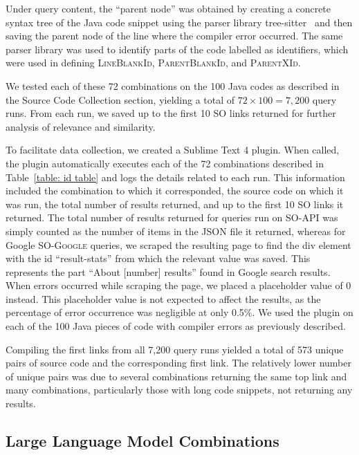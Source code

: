 \documentclass[preprint,12pt]{elsarticle}
\begin{document}
Under query content, the ``parent node'' was obtained by creating a concrete syntax tree of the Java code snippet using the parser library tree-sitter~\cite{tree-sitter} and then saving the parent node of the line where the compiler error occurred. The same parser library was used to identify parts of the code labelled as identifiers, which were used in defining \textsc{LineBlankId, ParentBlankId}, and \textsc{ParentXId}.

We tested each of these 72 combinations on the 100 Java codes as described in the Source Code Collection section, yielding a total of $72\times100=7,200$ query runs. From each run, we saved up to the first 10 SO links returned for further analysis of relevance and similarity. 

To facilitate data collection, we created a Sublime Text 4 plugin. When called, the plugin automatically executes each of the 72 combinations described in Table~\ref{table: id table} and logs the details related to each run. This information included the combination to which it corresponded, the source code on which it was run, the total number of results returned, and up to the first 10 SO links it returned. The total number of results returned for queries run on \textsc{SO-API} was simply counted as the number of items in the JSON file it returned, whereas for Google \textsc{SO-Google} queries, we scraped the resulting page to find the div element with the id ``result-stats'' from which the relevant value was saved. This represents the part ``About [number] results'' found in Google search results. When errors occurred while scraping the page, we placed a placeholder value of 0 instead. This placeholder value is not expected to affect the results, as the percentage of error occurrence was negligible at only 0.5\%. We used the plugin on each of the 100 Java pieces of code with compiler errors as previously described.

Compiling the first links from all 7,200 query runs yielded a total of 573 unique pairs of source code and the corresponding first link. The relatively lower number of unique pairs was due to several combinations returning the same top link and many combinations, particularly those with long code snippets, not returning any results.

\subsection{Large Language Model Combinations}
\end{document}
